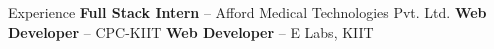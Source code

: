 \begin{noprefixrubric}{Experience}
%
	\textbf{Full Stack Intern} -- Afford Medical Technologies Pvt. Ltd.
%
%
	\textbf{Web Developer} -- CPC-KIIT
%
\entry*[01/2024 -- 06/2025]%
	\textbf{Web Developer} -- E Labs, KIIT
%
\end{noprefixrubric}